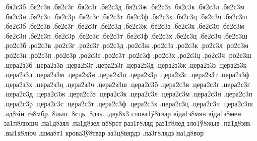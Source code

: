 {.бя2с3б
.бя2с3в
.бя2с3г
.бя2с3ґ
.бя2с3д
.бя2с3ж
.бя2с3з
.бя2с3к
.бя2с3л
.бя2с3м
.бя2с3н
.бя2с3п
.бя2с3р
.бя2с3с
.бя2с3т
.бя2с3ф
.бя2с3х
.бя2с3ц
.бя2с3ч
.бя2с3ш
.бе2с3б
.бе2с3в
.бе2с3г
.бе2с3ґ
.бе2с3д
.бе2с3ж
.бе2с3з
.бе2с3к
.бе2с3л
.бе2с3м
.бе2с3н
.бе2с3п
.бе2с3р
.бе2с3с
.бе2с3т
.бе2с3ф
.бе2с3х
.бе2с3ц
.бе2с3ч
.бе2с3ш
.ро2с3б
.ро2с3в
.ро2с3г
.ро2с3ґ
.ро2с3д
.ро2с3ж
.ро2с3з
.ро2с3к
.ро2с3л
.ро2с3м
.ро2с3н
.ро2с3п
.ро2с3р
.ро2с3с
.ро2с3т
.ро2с3ф
.ро2с3х
.ро2с3ц
.ро2с3ч
.ро2с3ш
.цера2з3б
.цера2з3в
.цера2з3г
.цера2з3ґ
.цера2з3д
.цера2з3ж
.цера2з3з
.цера2з3к
.цера2з3л
.цера2з3м
.цера2з3н
.цера2з3п
.цера2з3р
.цера2з3с
.цера2з3т
.цера2з3ф
.цера2з3х
.цера2з3ц
.цера2з3ч
.цера2з3ш
.цера2с3б
.цера2с3в
.цера2с3г
.цера2с3ґ
.цера2с3д
.цера2с3ж
.цера2с3з
.цера2с3к
.цера2с3л
.цера2с3м
.цера2с3н
.цера2с3п
.цера2с3р
.цера2с3с
.цера2с3т
.цера2с3ф
.цера2с3х
.цера2с3ц
.цера2с3ч
.цера2с3ш
.ад8зін
тэ8мбр.
8льш.
8сць.
8дзь.
.дву8х3
слова1ў8твар
віда1з8мян
віда1з8мен
за1п8люшч
.па1д8зял
.па1д8зел
вё8рст
раз1г8ляд
раз1г8лед
зло1ў8жыв
.па1д8зяк
.вы1к8люч
.шма8т1
крова3ў8твар
за3ц8вярдз
.па3г8лядз
на1д8вор
}

